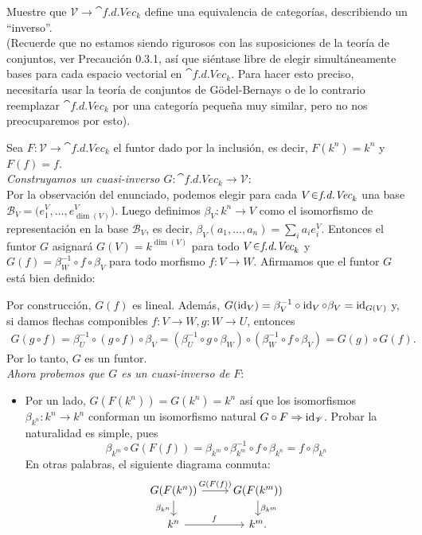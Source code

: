 \begin{nejer}
Muestre que $\mathscr{V} \to \cat{f.d.Vec}_k$ define una equivalencia de categorías, describiendo un ``inverso''.\medskip\\
(Recuerde que no estamos siendo rigurosos con las suposiciones de la teoría de conjuntos, ver Precaución 0.3.1, así que siéntase libre de elegir simultáneamente bases para cada espacio vectorial en $\cat{f.d.Vec}_k$. Para hacer esto preciso, necesitaría usar la teoría de conjuntos de G\"odel-Bernays o de lo contrario reemplazar $\cat{f.d.Vec}_k$ por una categoría pequeña muy similar, pero no nos preocuparemos por esto).
\end{nejer}
\begin{sol}
Sea $F\colon\mathscr{V}\to\cat{f.d.Vec}_k$ el funtor dado por la inclusión,
es decir, $F(k^n)=k^n$ y $F(f)=f$.\medskip\\
\emph{Construyamos un cuasi-inverso
$G\colon\cat{f.d.Vec}_k\to\mathscr{V}$}:\\
Por la observación del enunciado, podemos elegir para cada
$V\en\cat{f.d.Vec}_k$ una base
$\mathscr{B}_V=\bigl(e_1^V,\ldots,e_{\dim(V)}^V\bigr)$. Luego definimos $\beta_V\colon k^n\to V$ como el isomorfismo de representación en la base $\mathscr{B}_V$, es decir,
$\beta_V(a_1,\ldots,a_n)=\sum_{i} a_i e_i^V$. Entonces el funtor $G$ asignará $G(V)= k^{\dim(V)}$ para todo $V\en \cat{f.d.Vec}_k$ y $G(f)=\beta^{-1}_W\circ f\circ\beta_V$ para todo morfismo $f \colon V \to W$. Afirmamos que el funtor $G$ está bien definido:

Por construcción, $G(f)$ es lineal. Además, $G(\operatorname{id}_V)
=\beta_V^{-1}\circ\operatorname{id}_V\circ\beta_V
=\operatorname{id}_{G(V)}$
y, si damos flechas componibles $f \colon V\to W, g\colon W\to U$, entonces
\[
\begin{aligned}
G(g\circ f)
=\beta_U^{-1}\circ(g\circ f)\circ\beta_V
=(\beta_U^{-1}\circ g\circ\beta_W)
  \circ(\beta_W^{-1}\circ f\circ\beta_V)
=G(g)\circ G(f).
\end{aligned}
\]
Por lo tanto, $G$ es un funtor.\medskip\\
\emph{Ahora probemos que $G$ es un cuasi-inverso de $F$}:
\begin{itemize}
\item Por un lado, $G(F(k^n)) = G(k^n) = k^n$ así que los isomorfismos $\beta_{k^n}\colon k^n \to k^n$ conforman un isomorfismo natural $G \circ F \Rightarrow \operatorname{id}_{\mathscr{V}}$. Probar la naturalidad es simple, pues
\[
\beta_{k^m} \circ G(F(f)) 
=\beta_{k^m}\circ  \beta_{k^m}^{-1}\circ f\circ\beta_{k^n}
=f \circ \beta_{k^n}
\]
En otras palabras, el siguiente diagrama conmuta:
\[
\begin{tikzcd}[row sep = 1.4em]
G(F(k^n)) \arrow[r,"G(F(f))"] \arrow[d,"\beta_{k^n}"'] &
G(F(k^m)) \arrow[d,"\beta_{k^m}"]\\
k^n \arrow[r,"f"] & k^m.
\end{tikzcd}
\]


\end{itemize}
\end{sol}

